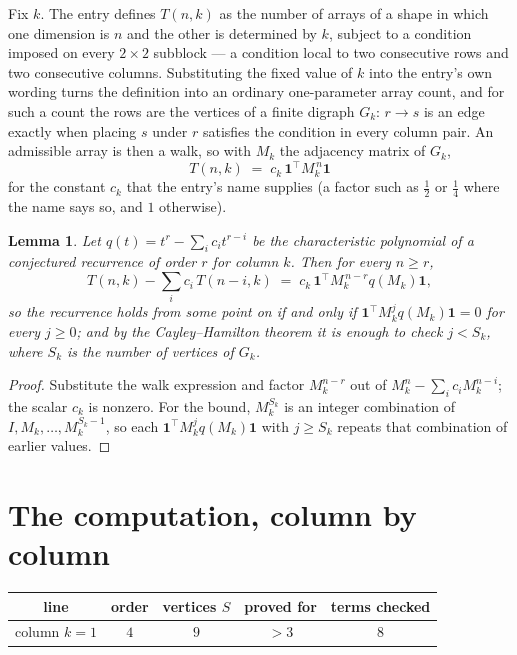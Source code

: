 \documentclass[11pt,a4paper]{article}
\theoremstyle{plain}
\newtheorem{lemma}[theorem]{Lemma}
\theoremstyle{definition}
\begin{document}
Fix $k$. The entry defines $T(n,k)$ as the number of arrays of a shape in which one dimension
is $n$ and the other is determined by $k$, subject to a condition imposed on every
$2\times2$ subblock --- a condition local to two consecutive rows and two consecutive columns.
Substituting the fixed value of $k$ into the entry's own wording turns the definition into an
ordinary one-parameter array count, and for such a count the rows are the vertices of a finite
digraph $G_k$: $r\to s$ is an edge exactly when placing $s$ under $r$ satisfies the condition
in every column pair. An admissible array is then a walk, so with $M_k$ the adjacency matrix
of $G_k$,
\[
T(n,k)\;=\;c_k\,\mathbf{1}^{\!\top}M_k^{\,n}\mathbf{1}
\]
for the constant $c_k$ that the entry's name supplies (a factor such as $\tfrac12$ or
$\tfrac14$ where the name says so, and $1$ otherwise).

\begin{lemma}\label{lem:crit}
Let $q(t)=t^{r}-\sum_i c_it^{r-i}$ be the characteristic polynomial of a conjectured
recurrence of order $r$ for column $k$. Then for every $n\ge r$,
\[
T(n,k)-\sum_i c_i\,T(n-i,k)\;=\;c_k\,\mathbf{1}^{\!\top}M_k^{\,n-r}q(M_k)\mathbf{1},
\]
so the recurrence holds from some point on if and only if
$\mathbf{1}^{\!\top}M_k^{j}q(M_k)\mathbf{1}=0$ for every $j\ge0$; and by the
Cayley--Hamilton theorem it is enough to check $j<S_k$, where $S_k$ is the number of vertices
of $G_k$.
\end{lemma}

\begin{proof}
Substitute the walk expression and factor $M_k^{n-r}$ out of $M_k^{n}-\sum_ic_iM_k^{n-i}$;
the scalar $c_k$ is nonzero. For the bound, $M_k^{S_k}$ is an integer combination of
$I,M_k,\dots,M_k^{S_k-1}$, so each $\mathbf{1}^{\!\top}M_k^{j}q(M_k)\mathbf{1}$ with
$j\ge S_k$ repeats that combination of earlier values.
\end{proof}

\section{The computation, column by column}

\begin{center}
\begin{tabular}{ccccc}
line & order & vertices $S$ & proved for & terms checked \\ \hline
column $k$$=1$ & $4$ & $9$ & $>3$ & $8$ \\
\end{tabular}
\end{center}
\end{document}
